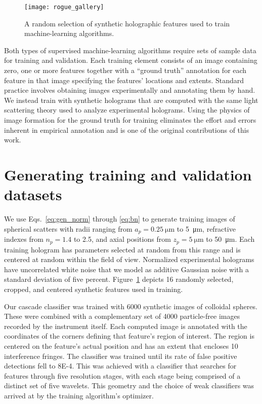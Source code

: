 \begin{figure}[b!]
  \centering
  \texttt{[image: rogue\_gallery]}	
  \caption{ A random selection of synthetic
  holographic features used to train machine-learning algorithms.} 
  \label{fig:rogue_gallery}
\end{figure}

Both types of supervised machine-learning algorithms 
require sets of sample data for training and validation.
Each training element
consists of an image containing
zero, one or more features together with
a ``ground truth'' annotation for each feature in that image
specifying the features' locations and extents.
Standard practice involves obtaining images experimentally
and annotating them by hand.
We instead train with synthetic holograms that are 
computed with the same light scattering theory \cite{lee07a}
used to analyze experimental holograms.
Using the physics of image formation
for the ground truth for training eliminates 
the effort and errors inherent in empirical annotation and is
one of the original contributions of this work.

\section{Generating training and validation datasets}

We use Eqs.~\eqref{eq:gen_norm} through \eqref{eq:bn} to generate training 
images of spherical scatters with radii ranging from 
$a_p = \SI{0.25}{\um}$ to \SI{5}{\um}, refractive indexes from 
$n_p = \num{1.4}$ to \num{2.5}, and axial positions from 
$z_p = \SI{5}{\um}$ to \SI{50}{\um}. 
Each training hologram has parameters selected at 
random from this 
range and is centered at random within
the field of view.
Normalized experimental holograms have uncorrelated white
noise that we model as additive Gaussian noise with a standard
deviation of five percent. Figure~\ref{fig:rogue_gallery} depicts
\num{16} randomly selected, cropped, and centered synthetic features
used in training.

Our cascade classifier was trained with \num{6000}
synthetic images of colloidal spheres.
These were combined with a complementary set of 
\num{4000} particle-free images recorded by the instrument itself.
Each computed image is annotated with
the coordinates of the corners defining that feature's region of
interest.
The region is centered on the feature's actual position
and has an extent that encloses 10 interference fringes.
The classifier was trained
until its rate of false positive detections
fell to \num{8E-4}.
This was achieved with a classifier that searches for features
through five resolution stages, with each stage being
comprised of a distinct set of five wavelets.
This geometry and the choice of weak classifiers was arrived at
by the training algorithm's optimizer.

